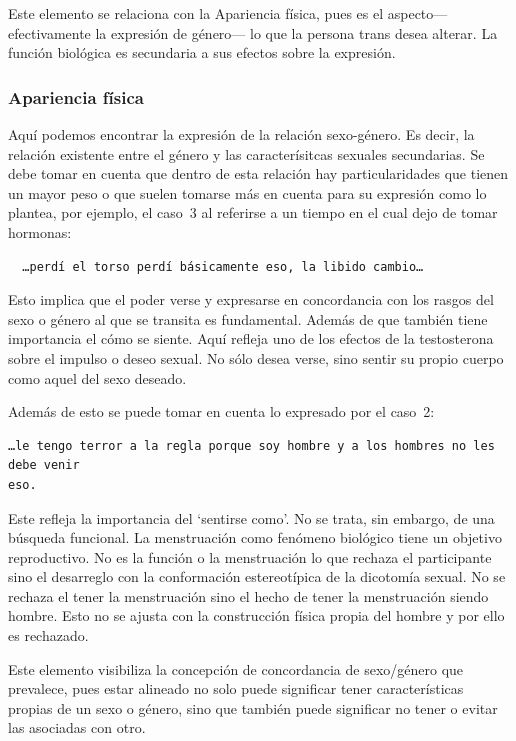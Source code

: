 Este elemento se relaciona con la Apariencia física, pues es el aspecto—
efectivamente la expresión de género— lo que la persona trans desea alterar. La
función biológica es secundaria a sus efectos sobre la expresión.

\subsubsection{Apariencia física}

Aquí podemos encontrar la expresión de la relación sexo-género. Es decir, la
relación existente entre el género y las caracterísitcas sexuales secundarias.
Se debe tomar en cuenta que dentro de esta relación hay particularidades que
tienen un mayor peso o que suelen tomarse más en cuenta para su expresión como
lo plantea, por ejemplo, el caso~3 al referirse a un tiempo en el cual dejo de
tomar hormonas:

\begin{verbatim}
  …perdí el torso perdí básicamente eso, la libido cambio…
\end{verbatim}

Esto implica que el poder verse y expresarse en concordancia con los rasgos del
sexo o género al que se transita es fundamental. Además de que también tiene
importancia el cómo se siente. Aquí refleja uno de los efectos de la
testosterona sobre el impulso o deseo sexual. No sólo desea verse, sino sentir
su propio cuerpo como aquel del sexo deseado.

Además de esto se puede tomar en cuenta lo expresado por el caso~2:

\begin{verbatim}
…le tengo terror a la regla porque soy hombre y a los hombres no les debe venir
eso.
\end{verbatim}

Este refleja la importancia del ‘sentirse como’. No se trata, sin embargo, de
una búsqueda funcional. La menstruación como fenómeno biológico tiene un
objetivo reproductivo. No es la función o la menstruación lo que rechaza el
participante sino el desarreglo con la conformación estereotípica de la
dicotomía sexual. No se rechaza el tener la menstruación sino el hecho de tener
la menstruación siendo hombre. Esto no se ajusta con la construcción física
propia del hombre y por ello es rechazado.

Este elemento visibiliza la concepción de concordancia de sexo/género que
prevalece, pues estar alineado no solo puede significar tener características
propias de un sexo o género, sino que también puede significar no tener o evitar
las asociadas con otro.

